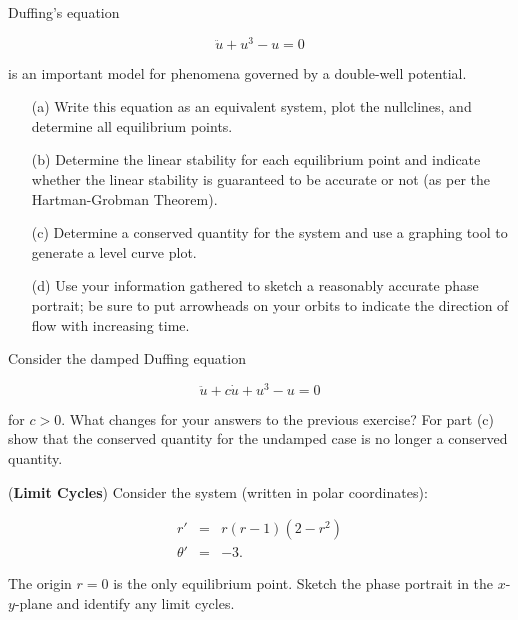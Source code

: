 \documentclass[11pt,letterpaper,boxed]{pset}
\begin{document}
\begin{problem} [Exercise 4.]
    Duffing's equation 
    
    \[ \ddot{u}+ u^3 - u = 0  \] 
    
    is an important model for phenomena governed by a double-well potential.  
    
    \begin{enumerate}
        \item[(a)] Write this equation as an equivalent system, plot the nullclines, and determine all equilibrium points.
        \item[(b)] Determine the linear stability for each equilibrium point and indicate whether the linear stability is guaranteed to be accurate or not (as per the Hartman-Grobman Theorem). 
        \item[(c)] Determine a conserved quantity for the system and use a graphing tool to generate a level curve plot. 
        \item[(d)] Use your information gathered to sketch a reasonably accurate phase portrait; be sure to put arrowheads on your orbits to indicate the direction of flow with increasing time. 
    \end{enumerate}
\end{problem}
\newpage

\begin{problem} [Exercise 5.]
    Consider the damped Duffing equation
    
    \[ \ddot{u} + c \dot{u} + u^3 - u = 0  \] 
    
    for $c > 0$.  What changes for your answers to the previous exercise?  For part (c) show that the conserved quantity for the undamped case is no longer a conserved quantity. 
\end{problem}
\newpage

\begin{problem} [Exercise 6.]
    (\textbf{Limit Cycles})
    Consider the system (written in polar coordinates):
    
    \begin{eqnarray*}
        r' & = &  r(r-1)(2-r^2) \\
         \theta' & = &  -3.
    \end{eqnarray*}
    
    The origin $r=0$ is the only equilibrium point. Sketch the phase portrait in the $x$-$y$-plane and identify any limit cycles.
\end{problem}
\newpage
\end{document}
